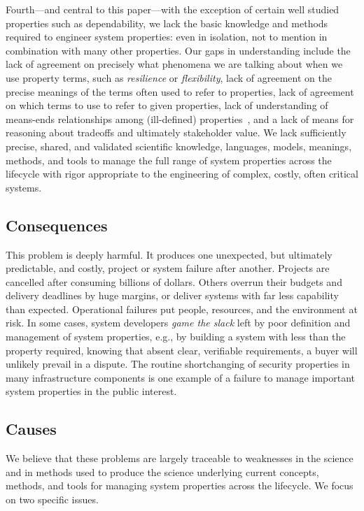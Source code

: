 \documentclass[conference]{IEEEtran}
\begin{document}
Fourth---and central to this paper---with the exception of certain well studied properties such as dependability, we lack the basic knowledge and methods required to engineer system properties: even in isolation, not to mention in combination with many other properties. Our gaps in understanding include the lack of agreement on precisely what phenomena we are talking about when we use property terms, such as {\em resilience} or {\em flexibility}, lack of agreement on the precise meanings of the terms often used to refer to properties, lack of agreement on which terms to use to refer to given properties, lack of understanding of means-ends relationships among (ill-defined) properties~\cite{Ross:semantic}, and a lack of means for reasoning about tradeoffs and ultimately stakeholder value. We lack sufficiently precise, shared, and validated scientific knowledge, languages, models, meanings, methods, and tools to manage the full range of system properties across the lifecycle with rigor appropriate to the engineering of complex, costly, often critical systems. 

\subsection{Consequences}

This problem is deeply harmful. It produces one unexpected, but ultimately predictable, and costly, project or system failure after another. Projects are cancelled after consuming billions of dollars. Others overrun their budgets and delivery deadlines by huge margins, or deliver systems with far less capability than expected. Operational failures put people, resources, and the environment at risk. In some cases, system developers {\em game the slack} left by poor definition and management of system properties, e.g., by building a system with less than the property required, knowing that absent clear, verifiable requirements, a buyer will unlikely prevail in a dispute. The routine shortchanging of security properties in many infrastructure components is one example of a failure to manage important system properties in the public interest. 

\subsection{Causes}

We believe that these problems are largely traceable to weaknesses in the science and in methods used to produce the science underlying current concepts, methods, and tools for managing system properties across the lifecycle. We focus on two specific issues.
\end{document}
